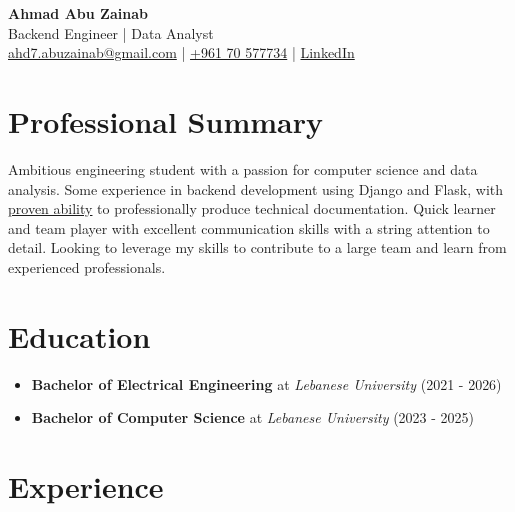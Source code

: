 \documentclass[11pt]{scrartcl}
\begin{document}
\begin{center}
	\textbf{\Large{Ahmad Abu Zainab}}\\
	Backend Engineer | Data Analyst\\
	\href{mailto:ahd7.abuzainab@gmail.com}{ahd7.abuzainab@gmail.com} | \href{tel:+96170577734}{+961 70 577734} | \href{https://www.linkedin.com/in/ahmad-abu-zainab-08892826b/}{LinkedIn}

\end{center}

\section*{Professional Summary}

\begin{tcolorbox}
	Ambitious engineering student with a passion for computer science and data analysis.
	Some experience in backend development using Django and Flask, with \href{https://github.com/the-refrigerator/ULFG-Notes}{proven ability} to professionally produce technical documentation.
	Quick learner and team player with excellent communication skills with a string attention to detail.
	Looking to leverage my skills to contribute to a large team and learn from experienced professionals.
\end{tcolorbox}


\section*{Education}

\begin{itemize}
	\item \textbf{Bachelor of Electrical Engineering} at \emph{Lebanese University} \hfill (2021 - 2026)
	\item \textbf{Bachelor of Computer Science} at \emph{Lebanese University} \hfill (2023 - 2025)
\end{itemize}

\section*{Experience}
\end{document}
